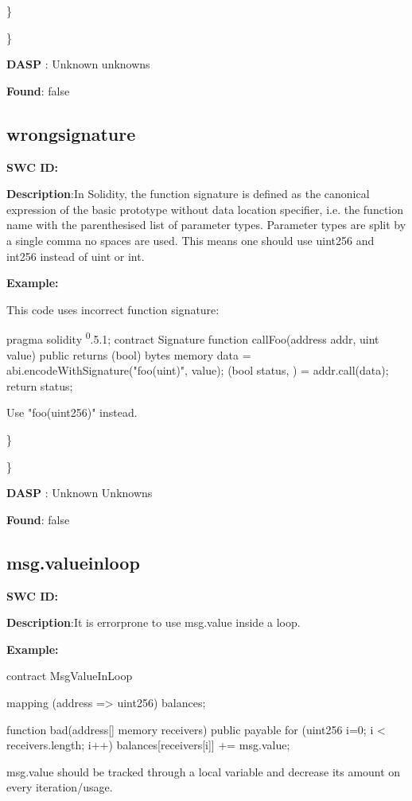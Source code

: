 \documentclass{article}
\begin{document}
\} 

\} 

\textbf{DASP} : Unknown unknowns

\textbf{Found}: false

\subsection{wrong\textunderscore signature} 
\textbf{SWC \textunderscore ID:} 

\textbf{Description}:In Solidity, the function signature is defined as the canonical expression of the basic prototype without data location specifier, i.e. the function name with the parenthesised list of parameter types. Parameter types are split by a single comma \textendash  no spaces are used. This means one should use uint256 and int256 instead of uint or int.


\textbf{Example:} 

This code uses incorrect function signature:

pragma solidity \textsuperscript0.5.1;
contract Signature {
    function callFoo(address addr, uint value) public returns (bool) {
        bytes memory data = abi.encodeWithSignature("foo(uint)", value);
        (bool status, ) = addr.call(data);
        return status;
    }
}

Use "foo(uint256)" instead.

\} 

\} 

\textbf{DASP} : Unknown Unknowns

\textbf{Found}: false

\subsection{msg.value\textunderscore in\textunderscore loop} 
\textbf{SWC \textunderscore ID:} 

\textbf{Description}:It is error\textendash prone to use msg.value inside a loop.


\textbf{Example:} 

contract MsgValueInLoop{
    mapping (address => uint256) balances;

    function bad(address[] memory receivers) public payable {
        for (uint256 i=0; i < receivers.length; i++) {
            balances[receivers[i]] += msg.value;
        }
    }
}

msg.value should be tracked through a local variable and decrease its amount on every iteration/usage.
\end{document}
